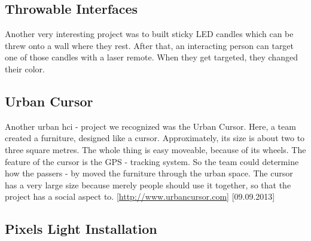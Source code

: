 \subsection{Throwable Interfaces}
Another very interesting project was to built sticky LED candles which can be threw onto a wall where they rest. After that, an interacting person can target one of those candles with a laser remote. When they get targeted, they changed their color. \newline

\subsection{Urban Cursor}


Another urban hci - project we recognized was the Urban Cursor.\newline 
Here, a team created a furniture, designed like a cursor. Approximately, its size is about two to three square metres. The whole thing is easy moveable, because of its wheels. The feature of the cursor is the GPS - tracking system. So the team could determine how the passers - by moved the furniture through the urban space.\newline
The cursor has a very large size because merely people should use it together, so that the project has a social aspect to.
[{\url{http://www.urbancursor.com}}] [09.09.2013] 

\subsection{Pixels Light Installation}

